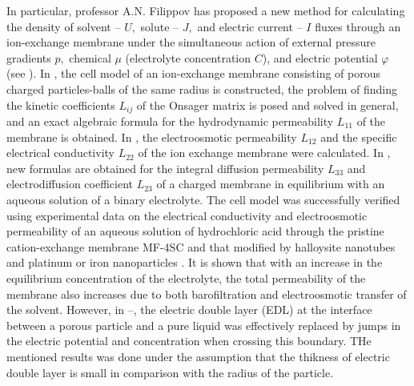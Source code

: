 \documentclass{amsart}
\begin{document}
In particular, professor A.N. Filippov has proposed a new method for calculating the density of solvent – $U,$ solute – $J,$ and electric current – $I$ fluxes through an ion-exchange membrane under the simultaneous action of external pressure gradients $p,$ chemical $\mu$ (electrolyte concentration $C$), and electric potential $\varphi$ (see  \cite{Filippov1}). In \cite{Filippov1}, the cell model of an ion-exchange membrane consisting of porous charged particles-balls of the same radius is constructed, the problem of finding the kinetic coefficients $L_{ij}$ of the Onsager matrix is posed and solved in general, and an exact algebraic formula for the hydrodynamic permeability $L_{11}$ of the membrane is obtained. In \cite{Filippov2}, the electroosmotic permeability $L_{12}$ and the specific electrical conductivity $L_{22}$ of the ion exchange membrane were calculated. In \cite{Filippov3}, new formulas are obtained for the integral diffusion permeability $L_{33}$ and electrodiffusion coefficient $L_{23}$ of a charged membrane in equilibrium with an aqueous solution of a binary electrolyte. The cell model was successfully verified using experimental data on the electrical conductivity and electroosmotic permeability of an aqueous solution of hydrochloric acid through the pristine cation-exchange membrane MF-4SC and that modified by halloysite nanotubes and platinum or iron nanoparticles \cite{Filippov4}. It is shown that with an increase in the equilibrium concentration of the electrolyte, the total permeability of the membrane also increases due to both barofiltration and electroosmotic transfer of the solvent. However, in \cite{Filippov1}--\cite{Filippov4}, the electric double layer (EDL) at the interface between a porous particle and a pure liquid was effectively replaced by jumps in the electric potential and concentration when crossing this boundary. THe mentioned results was done under the assumption that the thikness of electric double layer is small in comparison with the radius of the particle.
\end{document}
